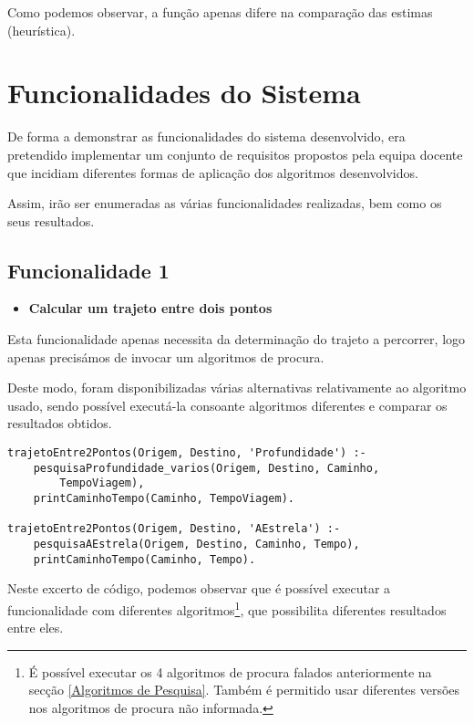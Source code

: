 \documentclass[a4paper,12pt]{report}
\begin{document}
\par Como podemos observar, a função apenas difere na comparação das estimas (heurística).

\section{Funcionalidades do Sistema}

De forma a demonstrar as funcionalidades do sistema desenvolvido, era pretendido implementar um conjunto de requisitos propostos pela equipa docente que incidiam diferentes formas de aplicação dos algoritmos desenvolvidos.
\par Assim, irão ser enumeradas as várias funcionalidades realizadas, bem como os seus resultados.


\subsection{Funcionalidade 1}
\begin{itemize}
    \item \textbf{Calcular um trajeto entre dois pontos}
\end{itemize} 
\par Esta funcionalidade apenas necessita da determinação do trajeto a percorrer, logo apenas precisámos de invocar um algoritmos de procura.
\par Deste modo, foram disponibilizadas várias alternativas relativamente ao algoritmo usado, sendo possível executá-la consoante algoritmos diferentes e comparar os resultados obtidos.


\begin{verbatim}
trajetoEntre2Pontos(Origem, Destino, 'Profundidade') :-   
    pesquisaProfundidade_varios(Origem, Destino, Caminho,
        TempoViagem), 
    printCaminhoTempo(Caminho, TempoViagem).

trajetoEntre2Pontos(Origem, Destino, 'AEstrela') :-
    pesquisaAEstrela(Origem, Destino, Caminho, Tempo),
    printCaminhoTempo(Caminho, Tempo).
\end{verbatim}

Neste excerto de código, podemos observar que é possível executar a funcionalidade com diferentes algoritmos\footnote{É possível executar os 4 algoritmos de procura falados anteriormente na secção \ref{Algoritmos de Pesquisa}. Também é permitido usar diferentes versões nos algoritmos de procura não informada.}, que possibilita diferentes resultados entre eles.

\vspace{0.5cm}
\end{document}

